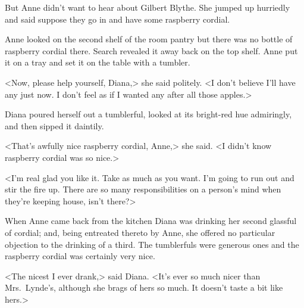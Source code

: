 But Anne didn't want to hear about Gilbert Blythe. She jumped up hurriedly and said suppose they go in and have some raspberry cordial.

Anne looked on the second shelf of the room pantry but there was no bottle of raspberry cordial there. Search revealed it away back on the top shelf. Anne put it on a tray and set it on the table with a tumbler.

<Now, please help yourself, Diana,> she said politely. <I don't believe I'll have any just now. I don't feel as if I wanted any after all those apples.>

Diana poured herself out a tumblerful, looked at its bright-red hue admiringly, and then sipped it daintily.

<That's awfully nice raspberry cordial, Anne,> she said. <I didn't know raspberry cordial was so nice.>

<I'm real glad you like it. Take as much as you want. I'm going to run out and stir the fire up. There are so many responsibilities on a person's mind when they're keeping house, isn't there?>

When Anne came back from the kitchen Diana was drinking her second glassful of cordial; and, being entreated thereto by Anne, she offered no particular objection to the drinking of a third. The tumblerfuls were generous ones and the raspberry cordial was certainly very nice.

<The nicest I ever drank,> said Diana. <It's ever so much nicer than Mrs.~Lynde's, although she brags of hers so much. It doesn't taste a bit like hers.>

